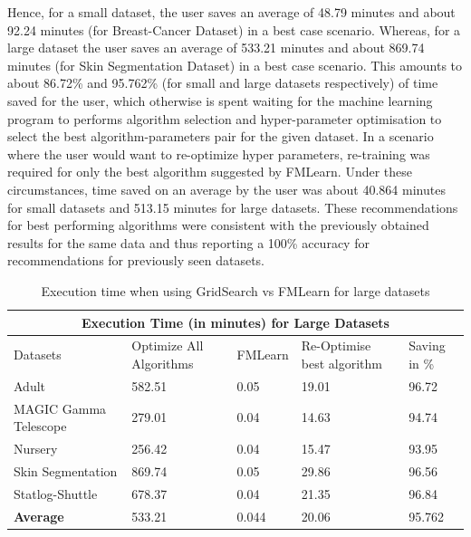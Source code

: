 Hence, for a small dataset, the user saves an average of 48.79 minutes and about 92.24 minutes (for Breast-Cancer Dataset) in a best case scenario. Whereas, for a large dataset the user saves an average of 533.21 minutes and about 869.74 minutes (for Skin Segmentation Dataset) in a best case scenario. This amounts to about 86.72\% and 95.762\% (for small and large datasets respectively) of time saved for the user, which otherwise is spent waiting for the machine learning program to performs algorithm selection and hyper-parameter optimisation to select the best algorithm-parameters pair for the given dataset. In a scenario where the user would want to re-optimize hyper parameters, re-training was required for only the best algorithm suggested by FMLearn. Under these circumstances, time saved on an average by the user was about 40.864 minutes for small datasets and 513.15 minutes for large datasets. These recommendations for best performing algorithms were consistent with the previously obtained results for the same data and thus reporting a 100\% accuracy for recommendations for previously seen datasets.

\begin{table}[H]
\centering 
\vspace*{+5pt}
 \begin{tabular}{ |p{1.8in}||p{1in}|p{0.7in}|p{1in}|p{0.8in}|  }
 \hline
 \multicolumn{5}{|c|}{Execution Time (in minutes) for Large Datasets} \\
 \hline
 Datasets & Optimize All Algorithms & FMLearn & Re-Optimise best algorithm & Saving in \%\\
 \hline
 Adult & 582.51 & 0.05 & 19.01 & 96.72 \\
 \hline
 MAGIC Gamma Telescope & 279.01 & 0.04 & 14.63 & 94.74 \\
  \hline
 Nursery & 256.42 &  0.04 & 15.47 & 93.95 \\
 \hline
 Skin Segmentation & 869.74 & 0.05 & 29.86 & 96.56 \\
 \hline
 Statlog-Shuttle & 678.37 & 0.04 & 21.35 & 96.84 \\
 \hline
 \hline
 \textbf{Average} & 533.21 & 0.044 & 20.06 & 95.762 \\
 \hline
\end{tabular}
\vspace*{+5pt}
\caption{Execution time when using GridSearch vs FMLearn for large datasets}
\label{table:2}
\end{table}
\vspace*{-10pt}

